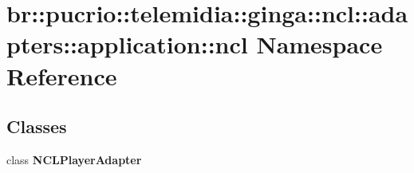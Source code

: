 \section{br::pucrio::telemidia::ginga::ncl::adapters::application::ncl Namespace Reference}
\label{namespacebr_1_1pucrio_1_1telemidia_1_1ginga_1_1ncl_1_1adapters_1_1application_1_1ncl}


\subsection*{Classes}
\begin{CompactItemize}
\item 
class {\bf NCLPlayerAdapter}
\end{CompactItemize}
